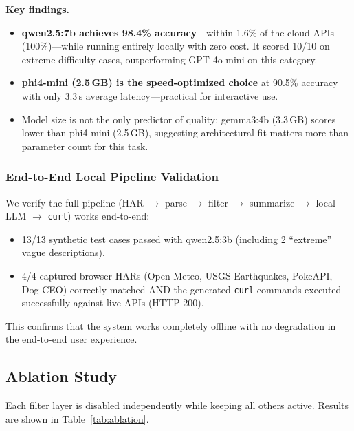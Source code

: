 \documentclass[10pt,twocolumn]{article}
\begin{document}
\textbf{Key findings.}
\begin{itemize}[nosep]
  \item \textbf{qwen2.5:7b achieves 98.4\% accuracy}---within 1.6\% of the cloud APIs (100\%)---while running entirely locally with zero cost. It scored 10/10 on extreme-difficulty cases, outperforming GPT-4o-mini on this category.
  \item \textbf{phi4-mini (2.5\,GB) is the speed-optimized choice} at 90.5\% accuracy with only 3.3\,s average latency---practical for interactive use.
  \item Model size is not the only predictor of quality: gemma3:4b (3.3\,GB) scores lower than phi4-mini (2.5\,GB), suggesting architectural fit matters more than parameter count for this task.
\end{itemize}

\subsubsection{End-to-End Local Pipeline Validation}

We verify the full pipeline (HAR $\to$ parse $\to$ filter $\to$ summarize $\to$ local LLM $\to$ \texttt{curl}) works end-to-end:

\begin{itemize}[nosep]
  \item 13/13 synthetic test cases passed with qwen2.5:3b (including 2 ``extreme'' vague descriptions).
  \item 4/4 captured browser HARs (Open-Meteo, USGS Earthquakes, PokeAPI, Dog CEO) correctly matched AND the generated \texttt{curl} commands executed successfully against live APIs (HTTP 200).
\end{itemize}

This confirms that the system works completely offline with no degradation in the end-to-end user experience.

\subsection{Ablation Study}

Each filter layer is disabled independently while keeping all others active. Results are shown in Table~\ref{tab:ablation}.
\end{document}
